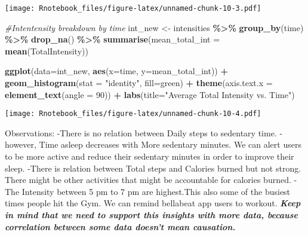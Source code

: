 \documentclass[
]{article}
\newenvironment{Shaded}{\begin{snugshade}}{\end{snugshade}}
\newcommand{\AttributeTok}[1]{\textcolor[rgb]{0.13,0.29,0.53}{#1}}
\newcommand{\CommentTok}[1]{\textcolor[rgb]{0.56,0.35,0.01}{\textit{#1}}}
\newcommand{\DecValTok}[1]{\textcolor[rgb]{0.00,0.00,0.81}{#1}}
\newcommand{\FunctionTok}[1]{\textcolor[rgb]{0.13,0.29,0.53}{\textbf{#1}}}
\newcommand{\NormalTok}[1]{#1}
\newcommand{\OtherTok}[1]{\textcolor[rgb]{0.56,0.35,0.01}{#1}}
\newcommand{\SpecialCharTok}[1]{\textcolor[rgb]{0.81,0.36,0.00}{\textbf{#1}}}
\newcommand{\StringTok}[1]{\textcolor[rgb]{0.31,0.60,0.02}{#1}}
\begin{document}
\texttt{[image: Rnotebook\_files/figure-latex/unnamed-chunk-10-3.pdf]}

\begin{Shaded}
\begin{Highlighting}[]
\CommentTok{\#Intentensity breakdown by time}
\NormalTok{int\_new }\OtherTok{\textless{}{-}}\NormalTok{ intensities }\SpecialCharTok{\%\textgreater{}\%}
  \FunctionTok{group\_by}\NormalTok{(time) }\SpecialCharTok{\%\textgreater{}\%}
  \FunctionTok{drop\_na}\NormalTok{() }\SpecialCharTok{\%\textgreater{}\%}
  \FunctionTok{summarise}\NormalTok{(}\AttributeTok{mean\_total\_int =} \FunctionTok{mean}\NormalTok{(TotalIntensity))}

\FunctionTok{ggplot}\NormalTok{(}\AttributeTok{data=}\NormalTok{int\_new, }\FunctionTok{aes}\NormalTok{(}\AttributeTok{x=}\NormalTok{time, }\AttributeTok{y=}\NormalTok{mean\_total\_int)) }\SpecialCharTok{+} \FunctionTok{geom\_histogram}\NormalTok{(}\AttributeTok{stat =} \StringTok{"identity"}\NormalTok{, }\AttributeTok{fill=}\StringTok{\textquotesingle{}green\textquotesingle{}}\NormalTok{) }\SpecialCharTok{+}
  \FunctionTok{theme}\NormalTok{(}\AttributeTok{axis.text.x =} \FunctionTok{element\_text}\NormalTok{(}\AttributeTok{angle =} \DecValTok{90}\NormalTok{)) }\SpecialCharTok{+}
  \FunctionTok{labs}\NormalTok{(}\AttributeTok{title=}\StringTok{"Average Total Intensity vs. Time"}\NormalTok{)}
\end{Highlighting}
\end{Shaded}

\texttt{[image: Rnotebook\_files/figure-latex/unnamed-chunk-10-4.pdf]}

Observations: -There is no relation between Daily steps to sedentary
time. -however, Time asleep decreases with More sedentary minutes. We
can alert users to be more active and reduce their sedentary minutes in
order to improve their sleep. -There is relation between Total steps and
Calories burned but not strong. There might be other activities that
might be accountable for calories burned. -The Intensity between 5 pm to
7 pm are highest.This also some of the busiest times people hit the Gym.
We can remind bellabeat app users to workout. \textbf{\emph{Keep in mind
that we need to support this insights with more data, because
correlation between some data doesn't mean causation.}}
\end{document}
